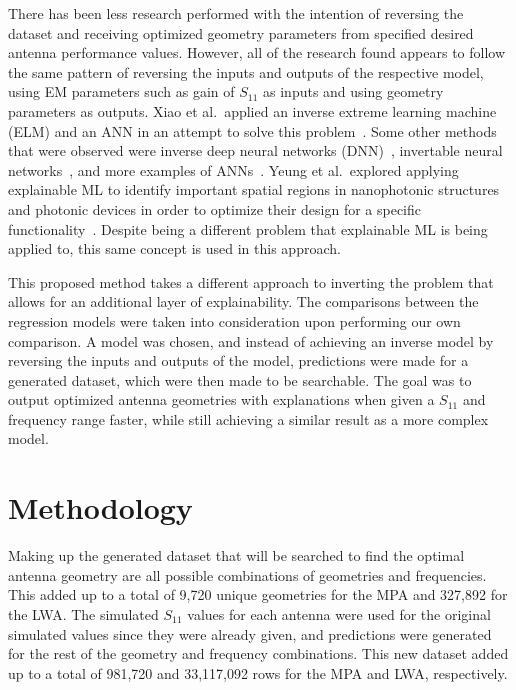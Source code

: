 \documentclass[conference]{IEEEtran}
\begin{document}
There has been less research performed with the intention of reversing the dataset and receiving optimized geometry parameters from specified desired antenna performance values. However, all of the research found appears to follow the same pattern of reversing the inputs and outputs of the respective model, using EM parameters such as gain of $S_{11}$ as inputs and using geometry parameters as outputs. Xiao et al.~applied an inverse extreme learning machine (ELM) and an ANN in an attempt to solve this problem~\cite{9063448,XiaoLi-Ye2021IANN}. Some other methods that were observed were inverse deep neural networks (DNN)~\cite{wu_ai_2024,zhang_inverse_2023}, invertable neural networks~\cite{yu_design_2020}, and more examples of ANNs~\cite{yuan_multibranch_2020}. Yeung et al.~explored applying explainable ML to identify important spatial regions in nanophotonic structures and photonic devices in order to optimize their design for a specific functionality~\cite{YeungChristopher2020EtBo,YeungChristopher2022EAOP}. Despite being a different problem that explainable ML is being applied to, this same concept is used in this approach. 

This proposed method takes a different approach to inverting the problem that allows for an additional layer of explainability. The comparisons between the regression models were taken into consideration upon performing our own comparison. A model was chosen, and instead of achieving an inverse model by reversing the inputs and outputs of the model, predictions were made for a generated dataset, which were then made to be searchable. The goal was to output optimized antenna geometries with explanations when given a $S_{11}$ and frequency range faster, while still achieving a similar result as a more complex model.


\section{Methodology}
Making up the generated dataset that will be searched to find the optimal antenna geometry are all possible combinations of geometries and frequencies. This added up to a total of 9,720 unique geometries for the MPA and 327,892 for the LWA. The simulated $S_{11}$ values for each antenna were used for the original simulated values since they were already given, and predictions were generated for the rest of the geometry and frequency combinations. This new dataset added up to a total of 981,720 and 33,117,092 rows for the MPA and LWA, respectively.
\end{document}

